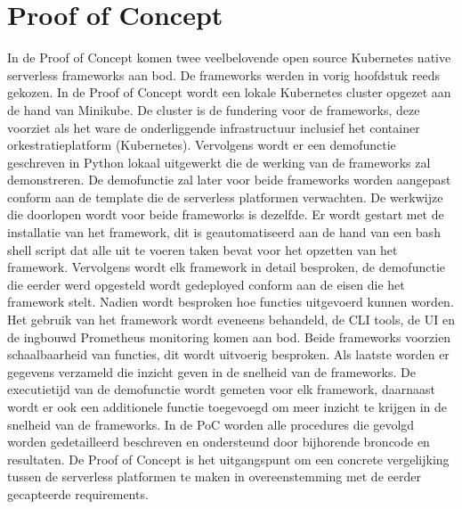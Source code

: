 \section{Proof of Concept}
In de Proof of Concept komen twee veelbelovende open source Kubernetes native serverless frameworks aan bod. De frameworks werden in vorig hoofdstuk reeds gekozen. In de Proof of Concept wordt een lokale Kubernetes cluster opgezet aan de hand van Minikube. De cluster is de fundering voor de frameworks, deze voorziet als het ware de onderliggende infrastructuur inclusief het container orkestratieplatform (Kubernetes). Vervolgens wordt er een demofunctie geschreven in Python lokaal uitgewerkt die de werking van de frameworks zal demonstreren. De demofunctie zal later voor beide frameworks worden aangepast conform aan de template die de serverless platformen verwachten. De werkwijze die doorlopen wordt voor beide frameworks is dezelfde. Er wordt gestart met de installatie van het framework, dit is geautomatiseerd aan de hand van een bash shell script dat alle uit te voeren taken bevat voor het opzetten van het framework. Vervolgens wordt elk framework in detail besproken, de demofunctie die eerder werd opgesteld wordt gedeployed conform aan de eisen die het framework stelt. Nadien wordt besproken hoe functies uitgevoerd kunnen worden. Het gebruik van het framework wordt eveneens behandeld, de CLI tools, de UI en de ingbouwd Prometheus monitoring komen aan bod. Beide frameworks voorzien schaalbaarheid van functies, dit wordt uitvoerig besproken. Als laatste worden er gegevens verzameld die inzicht geven in de snelheid van de frameworks. De executietijd van de demofunctie wordt gemeten voor elk framework, daarnaast wordt er ook een additionele functie toegevoegd om meer inzicht te krijgen in de snelheid van de frameworks. In de PoC worden alle procedures die gevolgd worden gedetailleerd beschreven en ondersteund door bijhorende broncode en resultaten. De Proof of Concept is het uitgangspunt om een concrete vergelijking tussen de serverless platformen te maken in overeenstemming met de eerder gecapteerde requirements.
